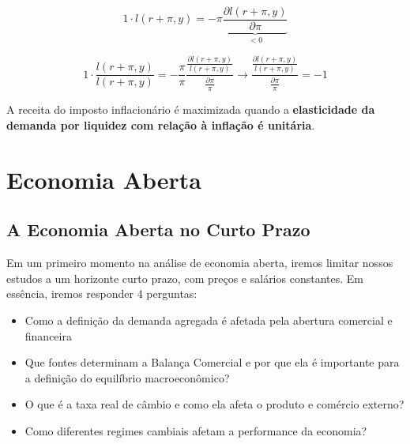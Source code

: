 \documentclass[a4paper,12pt]{article}[abntex2]
\begin{document}
\[
1\cdot l(r + \pi, y)= -\pi\underbrace{\frac{\partial l(r + \pi, y)}{\partial\pi}}_{<0}
\]

\[
1\cdot \frac{l(r + \pi, y)}{l(r + \pi, y)}=-\frac{\pi}{\pi} \frac{\frac{\partial l(r + \pi, y)}{l(r + \pi, y)}}{\frac{\partial\pi}{\pi}}\rightarrow\frac{\frac{\partial l(r + \pi, y)}{l(r + \pi, y)}}{\frac{\partial \pi}{\pi}}=-1
\]

A receita do imposto inflacionário é maximizada quando a \textbf{elasticidade da demanda por liquidez com relação à inflação é unitária}.


\newpage
\section{\textbf{Economia Aberta}}

\subsection{\textbf{A Economia Aberta no Curto Prazo}}
Em um primeiro momento na análise de economia aberta, iremos limitar nossos estudos a um horizonte curto prazo, com preços e salários constantes. Em essência, iremos responder 4 perguntas: \begin{itemize}
    \item Como  a  definição  da  demanda  agregada  é  afetada  pela  abertura  comercial  e financeira
    \item Que fontes determinam a Balança Comercial e por que ela é importante para a definição do equilíbrio macroeconômico? 
    \item O que é a taxa real de câmbio e como ela afeta o produto e comércio externo? 
    \item Como diferentes regimes cambiais afetam a performance da economia?
\end{itemize}
\end{document}
